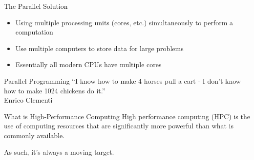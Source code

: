 
\begin{frame}{The Parallel Solution}
\begin{itemize}
\item Using multiple processing units (cores, etc.) simultaneously to perform a computation
\item Use multiple computers to store data for large problems
\item Essentially all modern CPUs have multiple cores
\end{itemize}
\end{frame}

\begin{frame}{Parallel Programming}
\centering
``I know how to make 4 horses pull a cart - I don't know how to make 1024
chickens do it.''\\Enrico Clementi
\end{frame}

\begin{frame}{What is High-Performance Computing}
\centering
High performance computing (HPC) is the use of computing resources that are
significantly more powerful than what is commonly available.

As such, it's always a moving target.
\end{frame}

